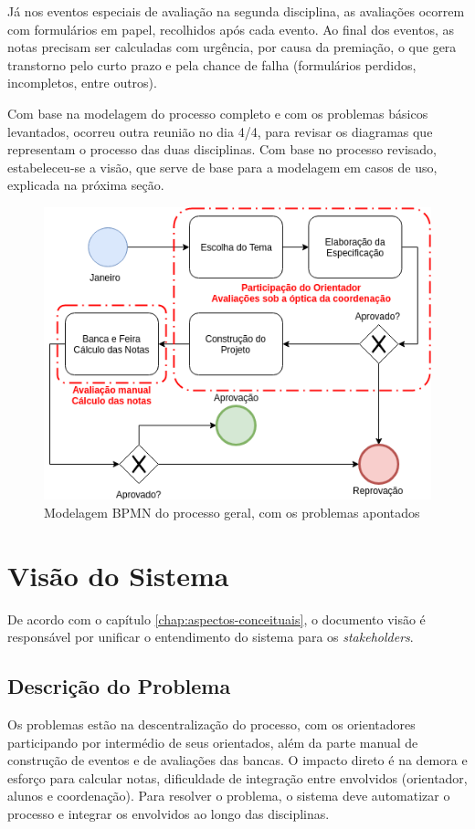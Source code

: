 Já nos eventos especiais de avaliação na segunda disciplina, as avaliações ocorrem com formulários em papel, recolhidos após cada evento. Ao final dos eventos, as notas precisam ser calculadas com urgência, por causa da premiação, o que gera transtorno pelo curto prazo e pela chance de falha (formulários perdidos, incompletos, entre outros).

Com base na modelagem do processo completo e com os problemas básicos levantados, ocorreu outra reunião no dia 4/4, para revisar os diagramas que representam o processo das duas disciplinas. Com base no processo revisado, estabeleceu-se a visão, que serve de base para a modelagem em casos de uso, explicada na próxima seção.

\begin{figure}[!htpb]
    \centering
    \includegraphics[scale=0.6]{imagens/bpmn_geral.png}
    \caption{Modelagem BPMN do processo geral, com os problemas apontados}
    \label{fig:bpmn-geral}
\end{figure}

\section{Visão do Sistema}
De acordo com o capítulo \ref{chap:aspectos-conceituais}, o documento visão é responsável por unificar o entendimento do sistema para os \textit{stakeholders}.

\subsection{Descrição do Problema}
Os problemas estão na descentralização do processo, com os orientadores participando por intermédio de seus orientados, além da parte manual de construção de eventos e de avaliações das bancas. O impacto direto é na demora e esforço para calcular notas, dificuldade de integração entre envolvidos (orientador, alunos e coordenação). Para resolver o problema, o sistema deve automatizar o processo e integrar os envolvidos ao longo das disciplinas.

